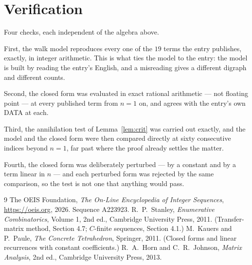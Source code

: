 \documentclass[11pt,a4paper]{article}
\theoremstyle{plain}
\theoremstyle{definition}
\begin{document}
\section{Verification}

Four checks, each independent of the algebra above.

First, the walk model reproduces every one of the $19$ terms the entry publishes,
exactly, in integer arithmetic. This is what ties the model to the entry: the model is built
by reading the entry's English, and a misreading gives a different digraph and different
counts.

Second, the closed form was evaluated in exact rational arithmetic --- not floating point ---
at every published term from $n=1$ on, and agrees with the entry's own DATA at each.

Third, the annihilation test of Lemma~\ref{lem:crit} was carried out exactly, and the model
and the closed form were then compared directly at sixty consecutive indices beyond
$n=1$, far past where the proof already settles the matter.

Fourth, the closed form was deliberately perturbed --- by a constant and by a term linear in
$n$ --- and each perturbed form was rejected by the same comparison, so the test is not one
that anything would pass.

\begin{thebibliography}{9}
 The OEIS Foundation, \emph{The On-Line Encyclopedia of Integer
Sequences}, \url{https://oeis.org}, 2026. Sequence A223923.
 R.~P.~Stanley, \emph{Enumerative Combinatorics}, Volume 1, 2nd ed.,
Cambridge University Press, 2011. (Transfer-matrix method, Section 4.7; $C$-finite sequences,
Section 4.1.)
 M.~Kauers and P.~Paule, \emph{The Concrete Tetrahedron}, Springer, 2011.
(Closed forms and linear recurrences with constant coefficients.)
 R.~A.~Horn and C.~R.~Johnson, \emph{Matrix Analysis}, 2nd ed., Cambridge
University Press, 2013.
\end{thebibliography}
\end{document}
